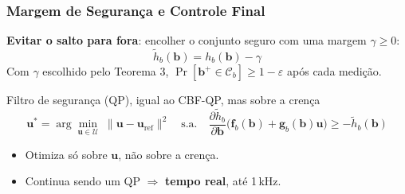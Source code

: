\begin{frame}

    \frametitle{Margem de Segurança e Controle Final}

    \textbf{Evitar o salto para fora}: encolher o conjunto seguro com uma margem $\gamma \geq 0$:
    \[
        \tilde{h}_b(\boldsymbol{b}) = h_b(\boldsymbol{b}) - \gamma
    \]
    {\small Com $\gamma$ escolhido pelo Teorema 3, $\Pr[\boldsymbol{b}^+ \in \mathcal{C}_b] \geq 1 - \varepsilon$ após cada medição.}

    \vspace{2mm}

    \begin{block}{Filtro de segurança (QP), igual ao CBF-QP, mas sobre a crença}
        \[
            \boldsymbol{u}^* = \arg\min_{\boldsymbol{u} \in \mathcal{U}} \; \|\boldsymbol{u} - \boldsymbol{u}_{\text{ref}}\|^2
            \quad \text{s.a.} \quad
            \frac{\partial \tilde{h}_b}{\partial \boldsymbol{b}} \big(\boldsymbol{f}_b(\boldsymbol{b}) + \boldsymbol{g}_b(\boldsymbol{b})\boldsymbol{u}\big) \geq -\tilde{h}_b(\boldsymbol{b})
        \]
    \end{block}

    \begin{itemize}
        \item Otimiza só sobre $\boldsymbol{u}$, não sobre a crença.
        \item Continua sendo um QP $\Rightarrow$ \textbf{tempo real}, até 1\,kHz.
    \end{itemize}

\end{frame}
